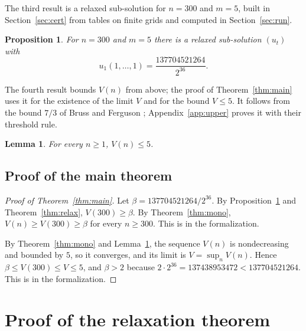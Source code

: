 \documentclass[11pt]{amsart}
\newtheorem{lemma}[theorem]{Lemma}
\newtheorem{proposition}[theorem]{Proposition}
\theoremstyle{definition}
\numberwithin{equation}{section}
\newcommand{\lean}[1]{\ignorespaces}
\newcommand{\computed}[1]{\ignorespaces}
\begin{document}
The third result is a relaxed sub-solution for $n=300$ and $m=5$, built in Section~\ref{sec:cert} from tables on finite grids and computed in Section~\ref{sec:run}.

\begin{proposition}\label{prop:cert300}\lean{Robbins.relaxed300, Robbins.v300, Robbins.Cert.SO.K.relaxed_of_chainSO, Robbins.Cert.SO.K.checkStep_sound, Robbins.Cert.SO.K.checkLast_sound, Robbins.Cert.SO.L.checkStep_of_lanesRanges, Robbins.Cert.SO.L.checkStep_of_lanesParts}\computed{code/soq/src/bin/soq.rs, code/soq/out/soq-m5-n300-r1.3-w0.35-14.txt}
For $n=300$ and $m=5$ there is a relaxed sub-solution $(u_t)$ with
\[
u_1(1,\dots,1)=\frac{137704521264}{2^{36}}.
\]
\end{proposition}

The fourth result bounds $V(n)$ from above; the proof of Theorem~\ref{thm:main} uses it for the existence of the limit $V$ and for the bound $V\le5$. It follows from the bound $7/3$ of Bruss and Ferguson \cite[Corollary~1]{BF93}; Appendix~\ref{app:upper} proves it with their threshold rule.

\begin{lemma}\label{lem:upper}\lean{Robbins.v_le_five, Robbins.Threshold.expectedRank_le_five, Robbins.Threshold.expectedRank_le_sum, Robbins.Threshold.rank_le_sum, Robbins.Threshold.law_real_box_le, Robbins.Threshold.survive_eq, Robbins.Threshold.sum_le_four}
For every $n\ge1$, $V(n)\le5$.
\end{lemma}

\subsection{Proof of the main theorem}
\begin{proof}[Proof of Theorem~\ref{thm:main}]
Let $\beta=137704521264/2^{36}$. By Proposition~\ref{prop:cert300} and Theorem~\ref{thm:relax}, $V(300)\ge \beta$. By Theorem~\ref{thm:mono}, $V(n)\ge V(300)\ge \beta$ for every $n\ge300$. This is  in the formalization.

By Theorem~\ref{thm:mono} and Lemma~\ref{lem:upper}, the sequence $V(n)$ is nondecreasing and bounded by $5$, so it converges, and its limit is $V=\sup_nV(n)$. Hence $\beta\le V(300)\le V\le5$, and $\beta>2$ because $2\cdot2^{36}=137438953472<137704521264$. This is  in the formalization.
\end{proof}

\section{Proof of the relaxation theorem}\label{sec:relax}
\end{document}
